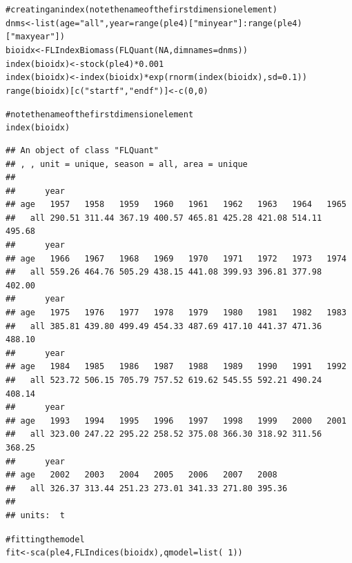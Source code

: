 \documentclass[a4paper,english,10pt]{article}\usepackage[]{graphicx}\usepackage[]{color}
\makeatletter
\newcommand{\hlnum}[1]{\textcolor[rgb]{0.2,0.2,0.2}{#1}}%
\newcommand{\hlstr}[1]{\textcolor[rgb]{0.2,0.2,0.2}{#1}}%
\newcommand{\hlcom}[1]{\textcolor[rgb]{0.2,0.267,0.4}{#1}}%
\newcommand{\hlopt}[1]{\textcolor[rgb]{0.2,0.2,0.2}{#1}}%
\newcommand{\hlstd}[1]{\textcolor[rgb]{0,0,0}{#1}}%
\newcommand{\hlkwb}[1]{\textcolor[rgb]{0.361,0.506,0.596}{#1}}%
\newcommand{\hlkwc}[1]{\textcolor[rgb]{0.361,0.506,0.596}{#1}}%
\newcommand{\hlkwd}[1]{\textcolor[rgb]{0.361,0.506,0.596}{#1}}%
\newenvironment{kframe}{%
 \def\at@end@of@kframe{}%
 \ifinner\ifhmode%
  \def\at@end@of@kframe{\end{minipage}}%
  \begin{minipage}{\columnwidth}%
 \fi\fi%
 \def\FrameCommand##1{\hskip\@totalleftmargin \hskip-\fboxsep
 \colorbox{shadecolor}{##1}\hskip-\fboxsep
     \hskip-\linewidth \hskip-\@totalleftmargin \hskip\columnwidth}%
 \MakeFramed {\advance\hsize-\width
   \@totalleftmargin\z@ \linewidth\hsize
   \@setminipage}}%
 {\par\unskip\endMakeFramed%
 \at@end@of@kframe}
\newenvironment{knitrout}{}{} %
\makeatother
\begin{document}
\begin{knitrout}
\color{fgcolor}\begin{kframe}
\begin{alltt}
\hlcom{# creating an index (note the name of the first dimension element)}
\hlstd{dnms} \hlkwb{<-} \hlkwd{list}\hlstd{(}\hlkwc{age}\hlstd{=}\hlstr{"all"}\hlstd{,} \hlkwc{year}\hlstd{=}\hlkwd{range}\hlstd{(ple4)[}\hlstr{"minyear"}\hlstd{]}\hlopt{:}\hlkwd{range}\hlstd{(ple4)[}\hlstr{"maxyear"}\hlstd{])}
\hlstd{bioidx} \hlkwb{<-} \hlkwd{FLIndexBiomass}\hlstd{(}\hlkwd{FLQuant}\hlstd{(}\hlnum{NA}\hlstd{,} \hlkwc{dimnames}\hlstd{=dnms))}
\hlkwd{index}\hlstd{(bioidx)} \hlkwb{<-} \hlkwd{stock}\hlstd{(ple4)}\hlopt{*}\hlnum{0.001}
\hlkwd{index}\hlstd{(bioidx)} \hlkwb{<-} \hlkwd{index}\hlstd{(bioidx)}\hlopt{*}\hlkwd{exp}\hlstd{(}\hlkwd{rnorm}\hlstd{(}\hlkwd{index}\hlstd{(bioidx),} \hlkwc{sd}\hlstd{=}\hlnum{0.1}\hlstd{))}
\hlkwd{range}\hlstd{(bioidx)[}\hlkwd{c}\hlstd{(}\hlstr{"startf"}\hlstd{,}\hlstr{"endf"}\hlstd{)]} \hlkwb{<-} \hlkwd{c}\hlstd{(}\hlnum{0}\hlstd{,}\hlnum{0}\hlstd{)}

\hlcom{# note the name of the first dimension element}
\hlkwd{index}\hlstd{(bioidx)}
\end{alltt}
\begin{verbatim}
## An object of class "FLQuant"
## , , unit = unique, season = all, area = unique
## 
##      year
## age   1957   1958   1959   1960   1961   1962   1963   1964   1965  
##   all 290.51 311.44 367.19 400.57 465.81 425.28 421.08 514.11 495.68
##      year
## age   1966   1967   1968   1969   1970   1971   1972   1973   1974  
##   all 559.26 464.76 505.29 438.15 441.08 399.93 396.81 377.98 402.00
##      year
## age   1975   1976   1977   1978   1979   1980   1981   1982   1983  
##   all 385.81 439.80 499.49 454.33 487.69 417.10 441.37 471.36 488.10
##      year
## age   1984   1985   1986   1987   1988   1989   1990   1991   1992  
##   all 523.72 506.15 705.79 757.52 619.62 545.55 592.21 490.24 408.14
##      year
## age   1993   1994   1995   1996   1997   1998   1999   2000   2001  
##   all 323.00 247.22 295.22 258.52 375.08 366.30 318.92 311.56 368.25
##      year
## age   2002   2003   2004   2005   2006   2007   2008  
##   all 326.37 313.44 251.23 273.01 341.33 271.80 395.36
## 
## units:  t
\end{verbatim}
\begin{alltt}
\hlcom{# fitting the model}
\hlstd{fit} \hlkwb{<-} \hlkwd{sca}\hlstd{(ple4,} \hlkwd{FLIndices}\hlstd{(bioidx),} \hlkwc{qmodel}\hlstd{=}\hlkwd{list}\hlstd{(}\hlopt{~}\hlnum{1}\hlstd{))}
\end{alltt}
\end{kframe}
\end{knitrout}
\end{document}
